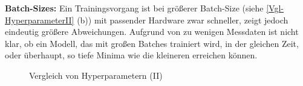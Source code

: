 \textbf{Batch-Sizes:}
Ein Trainingsvorgang ist bei größerer Batch-Size (siehe \textsf{\autoref{Vgl-HyperparameterII} (b)}) mit passender Hardware zwar schneller, zeigt jedoch eindeutig größere Abweichungen. Aufgrund von zu wenigen Messdaten ist nicht klar, ob ein Modell, das mit großen Batches trainiert wird, in der gleichen Zeit, oder überhaupt, so tiefe Minima wie die kleineren erreichen können. 
\begin{figure}[hb!]
	\centering
	\caption{Vergleich von Hyperparametern (II)}
	\label{Vgl-HyperparameterII}
\end{figure}
